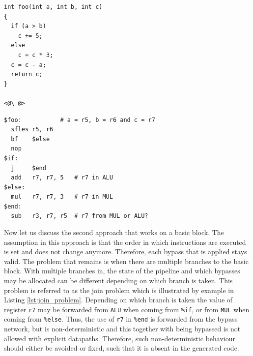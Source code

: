 \label{lst:join_problem}
\begin{center}
\hspace{2px}\begin{minipage}{.475\textwidth}
\lstset{style=customc}
\begin{lstlisting}[frame=tlrb]
int foo(int a, int b, int c)
{
  if (a > b)
    c += 5;
  else
    c = c * 3;
  c = c - a;
  return c;
}

<@\ @>
\end{lstlisting}
\end{minipage}\hfill
\begin{minipage}{.475\textwidth}
\lstset{style=customasm}
\begin{lstlisting}[frame=tlrb]
$foo:           # a = r5, b = r6 and c = r7
  sfles r5, r6
  bf    $else
  nop
$if:
  j     $end
  add   r7, r7, 5   # r7 in ALU
$else:
  mul   r7, r7, 3   # r7 in MUL 
$end:
  sub   r3, r7, r5  # r7 from MUL or ALU?
\end{lstlisting}
\end{minipage}
\end{center}



Now let us discuss the second approach that works on a basic block. The assumption in this approach is that the order in which instructions are executed is set and does not change anymore. Therefore, each bypass that is applied stays valid. 
The problem that remains is when there are multiple branches to the basic block. With multiple branches in, the state of the pipeline and which bypasses may be allocated can be different depending on which branch is taken. This problem is referred to as the join problem which is illustrated by example in Listing \ref{lst:join_problem}. Depending on which branch is taken the value of register \texttt{r7} may be forwarded from \texttt{ALU} when coming from \texttt{\%if}, or from \texttt{MUL} when coming from \texttt{\%else}. Thus, the use of \texttt{r7} in \texttt{\%end} is forwarded from the bypass network, but is non-deterministic and this together with being bypassed is not allowed with explicit datapaths. Therefore, such non-deterministic behaviour should either be avoided or fixed, such that it is absent in the generated code.\\

